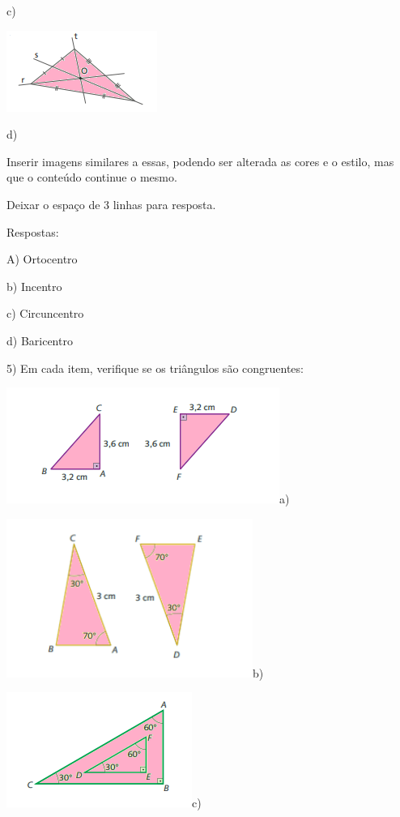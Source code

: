 c)

\includegraphics[width=1.9375in,height=1.04167in]{./imgSAEB_8_MAT/media/image18.png}

d)

Inserir imagens similares a essas, podendo ser alterada as cores e o
estilo, mas que o conteúdo continue o mesmo.

Deixar o espaço de 3 linhas para resposta.

Respostas:

A) Ortocentro

b) Incentro

c) Circuncentro

d) Baricentro

5) Em cada item, verifique se os triângulos são congruentes:

\includegraphics[width=3.51042in,height=1.48958in]{./imgSAEB_8_MAT/media/image19.png}a)

\includegraphics[width=3.16667in,height=2.03958in]{./imgSAEB_8_MAT/media/image20.png}b)

\includegraphics[width=2.38542in,height=1.47917in]{./imgSAEB_8_MAT/media/image21.png}c)

